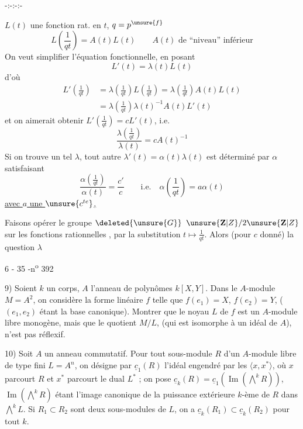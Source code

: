 \begin{center}-:-:-:-\end{center}
$L(t)$ une fonction rat. en $t$,  $q=p^{\unsure{f}}$
\[
L\left(\frac1{qt}\right)=A(t)L(t)\qquad A(t)\text{ de ``niveau'' inférieur}
\]
On veut simplifier l'équation fonctionnelle, en posant
\[
L'(t)=\lambda(t)L(t)
\]
d'où
\[
\begin{aligned}
L'\left(\frac1{qt}\right)&=\lambda\left(\frac1{qt}\right)L\left(\frac1{qt}\right)=\lambda\left(\frac1{qt}\right)A(t)L(t)\\
&=\lambda\left(\frac1{qt}\right)\lambda(t)^{-1}A(t)L'(t)
\end{aligned}
\]
et on aimerait obtenir $L'(\frac1{qt})=cL'(t)$, i.e.
\[
\frac{\lambda(\frac1{qt})}{\lambda(t)}=cA(t)^{-1}
\]
Si on trouve un tel $\lambda$, tout autre $\lambda'(t)=\alpha(t)\lambda(t)$  est déterminé par $\alpha$ satisfaisant
\[
\frac{\alpha(\frac1{qt})}{\alpha(t)}=\frac{c'}c\qquad\text{i.e.}\quad\alpha\left(\frac1{qt}\right)=a\alpha(t)
\]
\uline{avec $a$ une $\unsure{c^{te}}$,}

Faisons opérer le groupe $\deleted{\unsure{G}}$ $\unsure{\mathbf{Z}|Z}/2\unsure{\mathbf{Z}|Z}$ sur les  fonctions rationnelles , par la substitution $t\longmapsto\frac1{qt}$. Alors (pour $c$ donné) la question  $\lambda$

\begin{center}6 - 35 -\hfill n\textsuperscript{o} 392\end{center}

9) Soient $k$ un corps, $A$ l'anneau de polynômes $k[X,Y]$. Dans le $A$-module $M=A^2$, on considère la forme linéaire $f$ telle que $f(e_1)=X$, $f(e_2)=Y$, ($(e_1,e_2)$ étant la base canonique). Montrer que le noyau $L$ de $f$ est un $A$-module libre monogène, mais que le quotient $M/L$, (qui est isomorphe à un idéal de $A$), n'est pas réflexif.

10) Soit $A$ un anneau commutatif. Pour tout sous-module $R$ d'un $A$-module libre de type fini $L=A^n$, on désigne par $\underline c_1(R)$ l'idéal engendré par les $\langle x,x^*\rangle$, où $x$ parcourt $R$ et $x^*$ parcourt le dual $L^*$ ; on pose $\underline c_k(R)=\underline c_1(\operatorname{Im}(\bigwedge^k R))$, $\operatorname{Im}(\bigwedge^k R)$ étant l'image canonique de la puissance extérieure $k$-ème de $R$ dans $\bigwedge^k L$. Si $R_1\subset R_2$ sont deux sous-modules de $L$, on a $\underline c_k(R_1)\subset\underline c_k(R_2)$ pour tout $k$.

